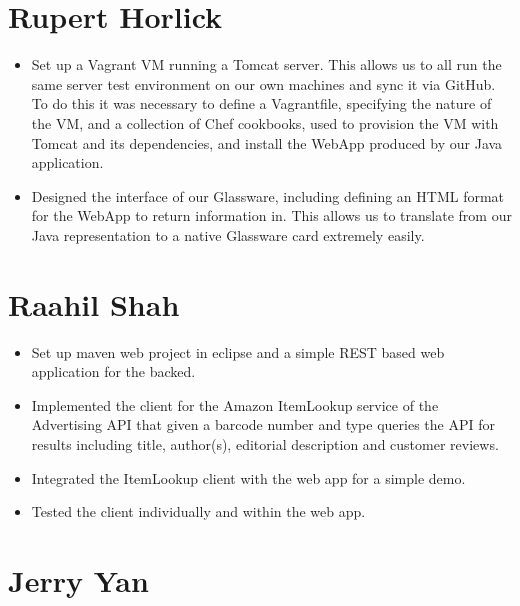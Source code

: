 \documentclass[12pt,a4paper]{report}
\begin{document}
\section{Rupert Horlick}

\begin{itemize}

\item Set up a Vagrant VM running a Tomcat server. This allows us to all run the same server test environment on our own machines and sync it via GitHub. To do this it was necessary to define a Vagrantfile, specifying the nature of the VM, and a collection of Chef cookbooks, used to provision the VM with Tomcat and its dependencies, and install the WebApp produced by our Java application.

\item Designed the interface of our Glassware, including defining an HTML format for the WebApp to return information in. This allows us to translate from our Java representation to a native Glassware card extremely easily.

\end{itemize}

\section{Raahil Shah}

\begin{itemize}

\item Set up maven web project in eclipse and a simple REST based web application for the backed.

\item Implemented the client for the Amazon ItemLookup service of the Advertising API that given a barcode number and type queries the API for results including title, author(s), editorial description and customer reviews.

\item Integrated the ItemLookup client with the web app for a simple demo.

\item Tested the client individually and within the web app.

\end{itemize}

\section{Jerry Yan}
\end{document}
